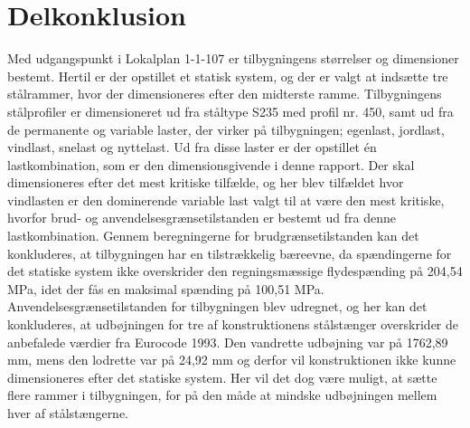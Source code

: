 \section{Delkonklusion}
Med udgangspunkt i Lokalplan 1-1-107 er tilbygningens størrelser og dimensioner bestemt. Hertil er der opstillet et statisk system, og der er valgt at indsætte tre stålrammer, hvor der  dimensioneres efter den midterste ramme.
\newline \indent{     }  Tilbygningens stålprofiler er dimensioneret ud fra ståltype S235 med profil nr. 450, samt ud fra de permanente og variable laster, der virker på tilbygningen; egenlast, jordlast, vindlast, snelast og nyttelast. Ud fra disse laster er der opstillet én lastkombination, som er den dimensionsgivende i denne rapport. Der skal dimensioneres efter det mest kritiske tilfælde, og her blev tilfældet hvor vindlasten er den dominerende variable last valgt til at være den mest kritiske, hvorfor brud- og anvendelsesgrænsetilstanden er bestemt ud fra denne lastkombination. 
\newline \indent{     }  Gennem beregningerne for brudgrænsetilstanden kan det konkluderes, at tilbygningen har en tilstrækkelig bæreevne, da spændingerne for det statiske system ikke overskrider den regningsmæssige flydespænding på 204,54 MPa, idet der fås en maksimal spænding på 100,51 MPa.
\newline \indent{     }  Anvendelsesgrænsetilstanden for tilbygningen blev udregnet, og her kan det konkluderes, at udbøjningen for tre af konstruktionens stålstænger overskrider de anbefalede værdier fra Eurocode 1993. Den vandrette udbøjning var på 1762,89 mm, mens den lodrette var på 24,92 mm og derfor vil konstruktionen ikke kunne dimensioneres efter det statiske system. Her vil det dog være muligt, at sætte flere rammer i tilbygningen, for på den måde at mindske udbøjningen mellem hver af stålstængerne.
